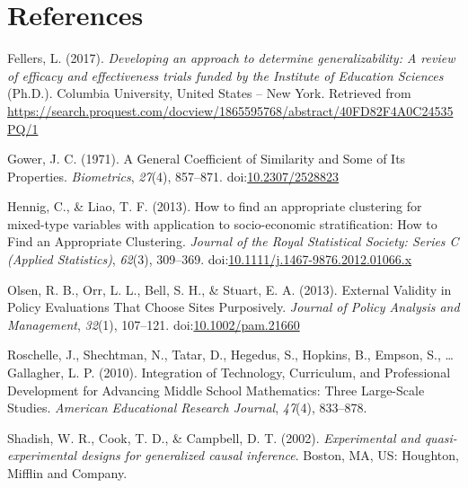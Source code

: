 \documentclass[man,floatsintext]{apa6}
\theoremstyle{definition}
\theoremstyle{definition}
\theoremstyle{definition}
\theoremstyle{remark}
\begin{document}
\newpage

\hypertarget{references}{%
\section{References}\label{references}}

\begingroup
\setlength{\parindent}{-0.5in}
\setlength{\leftskip}{0.5in}

\hypertarget{refs}{}
\leavevmode\hypertarget{ref-fellersDevelopingApproachDetermine2017}{}%
Fellers, L. (2017). \emph{Developing an approach to determine
generalizability: A review of efficacy and effectiveness trials funded
by the Institute of Education Sciences} (Ph.D.). Columbia University,
United States -- New York. Retrieved from
\url{https://search.proquest.com/docview/1865595768/abstract/40FD82F4A0C24535PQ/1}

\leavevmode\hypertarget{ref-gowerGeneralCoefficientSimilarity1971}{}%
Gower, J. C. (1971). A General Coefficient of Similarity and Some of Its
Properties. \emph{Biometrics}, \emph{27}(4), 857--871.
doi:\href{https://doi.org/10.2307/2528823}{10.2307/2528823}

\leavevmode\hypertarget{ref-hennigHowFindAppropriate2013}{}%
Hennig, C., \& Liao, T. F. (2013). How to find an appropriate clustering
for mixed-type variables with application to socio-economic
stratification: How to Find an Appropriate Clustering. \emph{Journal of
the Royal Statistical Society: Series C (Applied Statistics)},
\emph{62}(3), 309--369.
doi:\href{https://doi.org/10.1111/j.1467-9876.2012.01066.x}{10.1111/j.1467-9876.2012.01066.x}

\leavevmode\hypertarget{ref-olsenExternalValidityPolicy2013}{}%
Olsen, R. B., Orr, L. L., Bell, S. H., \& Stuart, E. A. (2013). External
Validity in Policy Evaluations That Choose Sites Purposively.
\emph{Journal of Policy Analysis and Management}, \emph{32}(1),
107--121.
doi:\href{https://doi.org/10.1002/pam.21660}{10.1002/pam.21660}

\leavevmode\hypertarget{ref-roschelleIntegrationTechnologyCurriculum2010}{}%
Roschelle, J., Shechtman, N., Tatar, D., Hegedus, S., Hopkins, B.,
Empson, S., \ldots{} Gallagher, L. P. (2010). Integration of Technology,
Curriculum, and Professional Development for Advancing Middle School
Mathematics: Three Large-Scale Studies. \emph{American Educational
Research Journal}, \emph{47}(4), 833--878.

\leavevmode\hypertarget{ref-shadishExperimentalQuasiexperimentalDesigns2002}{}%
Shadish, W. R., Cook, T. D., \& Campbell, D. T. (2002).
\emph{Experimental and quasi-experimental designs for generalized causal
inference}. Boston, MA, US: Houghton, Mifflin and Company.
\end{document}
